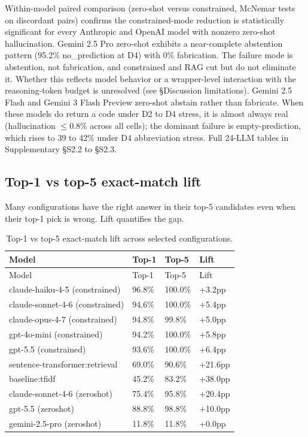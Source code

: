 Within-model paired comparison (zero-shot versus constrained,
McNemar tests on discordant pairs) confirms the constrained-mode
reduction is statistically significant for every Anthropic and
OpenAI model with nonzero zero-shot hallucination. Gemini 2.5 Pro
zero-shot exhibits a near-complete abstention pattern (95.2\%
no\_prediction at D4) with 0\% fabrication. The failure mode is
abstention, not fabrication, and constrained and RAG cut but do
not eliminate it. Whether this reflects model behavior or a
wrapper-level interaction with the reasoning-token budget is
unresolved (see §Discussion limitations). Gemini 2.5 Flash and
Gemini 3 Flash Preview zero-shot abstain rather than fabricate.
When these models do return a code under D2 to D4 stress, it is
almost always real (hallucination $\leq$0.8\% across all cells); the
dominant failure is empty-prediction, which rises to 39 to 42\%
under D4 abbreviation stress. Full 24-LLM tables in Supplementary
§S2.2 to §S2.3.

\subsection{Top-1 vs top-5 exact-match lift}\label{top-1-vs-top-5-exact-match-lift}

Many configurations have the right answer in their top-5
candidates even when their top-1 pick is wrong. Lift quantifies
the gap.

\begin{longtable}[]{@{}llll@{}}
\caption{Top-1 vs top-5 exact-match lift across selected configurations.}\tabularnewline
\toprule()
Model & Top-1 & Top-5 & Lift \\
\midrule()
\endfirsthead
\toprule()
Model & Top-1 & Top-5 & Lift \\
\midrule()
\endhead
claude-haiku-4-5 (constrained) & 96.8\% & 100.0\% & +3.2pp \\
claude-sonnet-4-6 (constrained) & 94.6\% & 100.0\% & +5.4pp \\
claude-opus-4-7 (constrained) & 94.8\% & 99.8\% & +5.0pp \\
gpt-4o-mini (constrained) & 94.2\% & 100.0\% & +5.8pp \\
gpt-5.5 (constrained) & 93.6\% & 100.0\% & +6.4pp \\
sentence-transformer:retrieval & 69.0\% & 90.6\% & +21.6pp \\
baseline:tfidf & 45.2\% & 83.2\% & +38.0pp \\
claude-sonnet-4-6 (zeroshot) & 75.4\% & 95.8\% & +20.4pp \\
gpt-5.5 (zeroshot) & 88.8\% & 98.8\% & +10.0pp \\
gemini-2.5-pro (zeroshot) & 11.8\% & 11.8\% & +0.0pp \\
\bottomrule()
\end{longtable}

